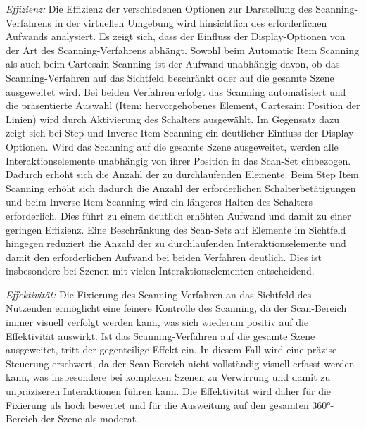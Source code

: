 \textit{Effizienz:}
Die Effizienz der verschiedenen Optionen zur Darstellung des Scanning-Verfahrens in der virtuellen Umgebung wird hinsichtlich des erforderlichen Aufwands analysiert. Es zeigt sich, dass der Einfluss der Display-Optionen von der Art des Scanning-Verfahrens abhängt.
Sowohl beim Automatic Item Scanning als auch beim Cartesain Scanning ist der Aufwand unabhängig davon, ob das Scanning-Verfahren auf das Sichtfeld beschränkt oder auf die gesamte Szene ausgeweitet wird. Bei beiden Verfahren erfolgt das Scanning automatisiert und die präsentierte Auswahl (Item: hervorgehobenes Element, Cartesain: Position der Linien) wird durch Aktivierung des Schalters ausgewählt. Im Gegensatz dazu zeigt sich bei Step und Inverse Item Scanning ein deutlicher Einfluss der Display-Optionen. Wird das Scanning auf die gesamte Szene ausgeweitet, werden alle Interaktionselemente unabhängig von ihrer Position in das Scan-Set einbezogen. Dadurch erhöht sich die Anzahl der zu durchlaufenden Elemente. Beim Step Item Scanning erhöht sich dadurch die Anzahl der erforderlichen Schalterbetätigungen und beim Inverse Item Scanning wird ein längeres Halten des Schalters erforderlich. Dies führt zu einem deutlich erhöhten Aufwand und damit zu einer geringen Effizienz. Eine Beschränkung des Scan-Sets auf Elemente im Sichtfeld hingegen reduziert die Anzahl der zu durchlaufenden Interaktionselemente und damit den erforderlichen Aufwand bei beiden Verfahren deutlich. Dies ist insbesondere bei Szenen mit vielen Interaktionselementen entscheidend. 

\textit{Effektivität:}
Die Fixierung des Scanning-Verfahren an das Sichtfeld des Nutzenden ermöglicht eine feinere Kontrolle des Scanning, da der Scan-Bereich immer visuell verfolgt werden kann, was sich wiederum positiv auf die Effektivität auswirkt. Ist das Scanning-Verfahren auf die gesamte Szene ausgeweitet, tritt der gegenteilige Effekt ein. In diesem Fall wird eine präzise Steuerung erschwert, da der Scan-Bereich nicht vollständig visuell erfasst werden kann, was insbesondere bei komplexen Szenen zu Verwirrung und damit zu unpräziseren Interaktionen führen kann. Die Effektivität wird daher für die Fixierung als hoch bewertet und für die Ausweitung auf den gesamten 360°-Bereich der Szene als moderat. 

